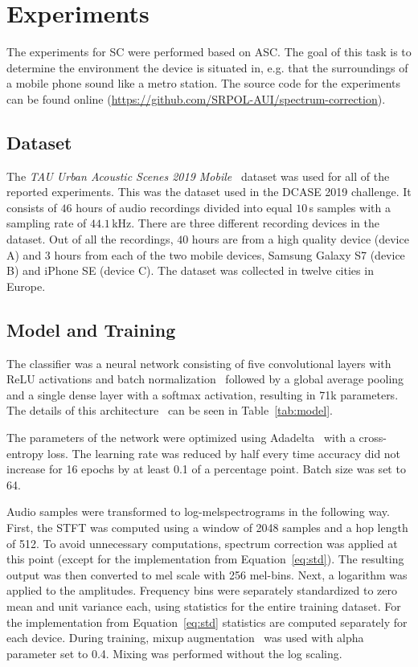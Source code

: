 \documentclass[a4paper]{article}
\newcommand{\sourcecode}{\url{https://github.com/SRPOL-AUI/spectrum-correction}}
\begin{document}
\section{Experiments}
\label{sec:experiments}

The experiments for SC were performed based on ASC. The goal of this task is to determine the environment the device is situated in, e.g. that the surroundings of a mobile phone sound like a metro station. The source code for the experiments can be found online (\sourcecode).


\subsection{Dataset}
\label{ssec:dataset}

The \textit{TAU Urban Acoustic Scenes 2019 Mobile}~\cite{dcase} dataset was used for all of the reported experiments.  This was the dataset used in the DCASE 2019 challenge. It consists of $46$ hours of audio recordings divided into equal $10$\,s samples with a sampling rate of $44.1$\,kHz. There are three different recording devices in the dataset. Out of all the recordings, $40$ hours are from a high quality device (device A) and $3$ hours from each of the two mobile devices, Samsung Galaxy S7 (device B) and iPhone SE (device C). The dataset was collected in twelve cities in Europe. 

\subsection{Model and Training}
\label{ssec:model-training}

The classifier was a neural network consisting of five convolutional layers with ReLU activations and batch normalization~\cite{batch-norm} followed by a global average pooling and a single dense layer with a softmax activation, resulting in 71k parameters. The details of this architecture~\cite{Komider2019} can be seen in Table~\ref{tab:model}.

The parameters of the network were optimized using Adadelta~\cite{adadelta} with a cross-entropy loss. The learning rate was reduced by half every time accuracy did not increase for 16 epochs by at least 0.1 of a percentage point. Batch size was set to 64.

Audio samples were transformed to log-melspectrograms in the following way. First, the STFT was computed using a window of 2048 samples and a hop length of 512. To avoid unnecessary computations, spectrum correction was applied at this point (except for the implementation from Equation~\eqref{eq:std}). The resulting output was then converted to mel scale with 256 mel-bins. Next, a logarithm was applied to the amplitudes.
Frequency bins were separately standardized to zero mean and unit variance each, using statistics for the entire training dataset. For the implementation from Equation~\eqref{eq:std} statistics are computed separately for each device.
During training, mixup augmentation~\cite{mixup} was used with alpha parameter set to 0.4. Mixing was performed without the log scaling. 
\end{document}
